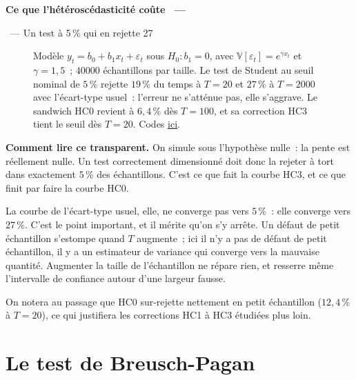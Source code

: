 \documentclass[10pt,a4paper]{article}
\makeatletter
\newcommand{\coursfile}{chapitre-4}
\newcommand{\HEAD}{HEAD}%
\newcommand{\repourl}{https://github.com/stepan-a/econometrics}
\newcommand{\coderef}[1]{\href{\repourl/blob/\HEAD/routines/\coursfile/#1}{ici}}
\theoremstyle{definition}
\newenvironment{frame}[1][]{\par}{\par}
\newcommand{\frameheadrule}{%
  \par\nobreak\vspace{1pt}{\color{ctitle}\hrule height 0.6pt}\nobreak\vspace{4pt}}
\newcommand{\frametitle}[1]{%
  \par\addvspace{8pt plus 2pt}\needspace{6\baselineskip}%
  \noindent\begingroup\color{ctitle}\sffamily\bfseries\large #1\endgroup
  \@ifnextchar\framesubtitle{}{\frameheadrule}}
\newcommand{\framesubtitle}[1]{%
  \begingroup\color{ctitle}\sffamily\normalsize\ --- #1\endgroup\frameheadrule}
\makeatother
\begin{document}
\begin{frame}[c]
  \frametitle{Ce que l'hétéroscédasticité coûte}
  \framesubtitle{Un test à 5\,\% qui en rejette 27}

  \begin{figure}
    \centering
    \caption{Modèle $y_t = b_0 + b_1x_t + \varepsilon_t$ sous $H_0: b_1=0$, avec
      $\mathbb V[\varepsilon_t] = e^{\gamma x_t}$ et $\gamma=1{,}5$~; $40000$
      échantillons par taille. Le test de Student au seuil nominal de $5\,\%$
      rejette $19\,\%$ du temps à $T=20$ et $27\,\%$ à $T=2000$ avec l'écart-type
      usuel~: l'erreur ne s'atténue pas, elle s'aggrave. Le sandwich HC0 revient
      à $6{,}4\,\%$ dès $T=100$, et sa correction HC3 tient le seuil dès $T=20$.
      Codes \coderef{taille-tests-student.py}.}
  \end{figure}

\end{frame}


\begin{notes}

  \textbf{Comment lire ce transparent.} On simule sous l'hypothèse nulle~: la
  pente est réellement nulle. Un test correctement dimensionné doit donc la
  rejeter à tort dans exactement $5\,\%$ des échantillons. C'est ce que fait la
  courbe HC3, et ce que finit par faire la courbe HC0.

  \bigskip

  La courbe de l'écart-type usuel, elle, ne converge pas vers $5\,\%$~: elle
  converge vers $27\,\%$. C'est le point important, et il mérite qu'on s'y
  arrête. Un défaut de petit échantillon s'estompe quand $T$ augmente~; ici il
  n'y a pas de défaut de petit échantillon, il y a un estimateur de variance qui
  converge vers la mauvaise quantité. Augmenter la taille de l'échantillon ne
  répare rien, et resserre même l'intervalle de confiance autour d'une largeur
  fausse.

  \bigskip

  On notera au passage que HC0 sur-rejette nettement en petit échantillon
  ($12{,}4\,\%$ à $T=20$), ce qui justifiera les corrections HC1 à HC3
  étudiées plus loin.

\end{notes}


\section{Le test de Breusch-Pagan}
\end{document}
